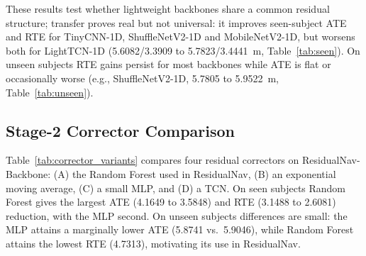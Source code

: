 \documentclass[10pt,conference,letterpaper]{IEEEtran}
\begin{document}
These results test whether lightweight backbones share a common
residual structure; transfer proves real but not universal: it
improves seen-subject ATE and RTE for TinyCNN-1D, ShuffleNetV2-1D and
MobileNetV2-1D, but worsens both for LightTCN-1D (5.6082/3.3909 to
5.7823/3.4441~m, Table~\ref{tab:seen}). On unseen subjects RTE gains
persist for most backbones while ATE is flat or occasionally worse
(e.g., ShuffleNetV2-1D, 5.7805 to 5.9522~m, Table~\ref{tab:unseen}).

\subsection{Stage-2 Corrector Comparison}

Table~\ref{tab:corrector_variants} compares four residual correctors on
ResidualNav-Backbone: (A) the Random Forest used in ResidualNav,
(B) an exponential moving average, (C) a small MLP, and (D) a TCN. On
seen subjects Random Forest gives the largest ATE (4.1649 to 3.5848)
and RTE (3.1488 to 2.6081) reduction, with the MLP second. On unseen
subjects differences are small: the MLP attains a marginally lower ATE
(5.8741 vs.\ 5.9046), while Random Forest attains the lowest RTE
(4.7313), motivating its use in ResidualNav.

\begin{table}[htbp]
\caption{Stage-2 Residual Corrector Comparison on ResidualNav-Backbone (ATE / RTE, m, Mean $\pm$ Std over 32 Sequences). Best value per column in bold.}
\label{tab:corrector_variants}
\centering
\scriptsize
{}
\end{table}
\end{document}
